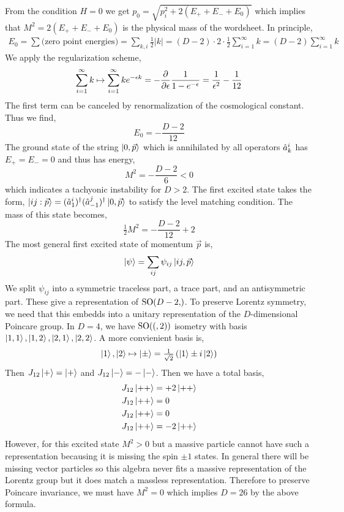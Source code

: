 \documentclass[12pt]{extarticle}
\begin{document}
From the condition $H = 0$ we get $p_0 = \sqrt{p_i^2 + 2 (E_{+} + E_{-} + E_0)}$ which implies that $M^2 = 2 (E_{+} + E_{-} + E_0)$ is the physical mass of the wordsheet. In principle,
\begin{align*}
E_0 = \sum \text{(zero point energies)} = \sum_{k,i} \tfrac{1}{2} |k| = (D - 2) \cdot 2 \cdot \tfrac{1}{2} \sum_{i = 1}^{\infty} k = (D - 2) \sum_{i = 1}^\infty k 
\end{align*}
We apply the regularization scheme,
\[ \sum_{i = 1}^\infty k \mapsto \sum_{i = 1}^\infty k e^{- \epsilon k} = - \frac{\partial{}}{\partial{\epsilon}} \frac{1}{1 - e^{-\epsilon}} = \frac{1}{\epsilon^2} - \frac{1}{12} \]
The first term can be canceled by renormalization of the cosmological constant. Thus we find,
\[ E_0 = - \frac{D - 2}{12} \]
The ground state of the string $\left| 0, \vec{p} \right>$ which is annihilated by all operators $\hat{a}^i_k$ has $E_{+} = E_{-} = 0$ and thus has energy,
\[ M^2 = - \frac{D - 2}{6} < 0 \]
which indicates a tachyonic instability for $D > 2$. The first excited state takes the form, $\left| ij : \vec{p} \right> = (\hat{a}^i_{1})^\dagger (\hat{a}^j_{-1})^\dagger \left| 0, \vec{p} \right>$ to satisfy the level matching condition. The mass of this state becomes, 
\[ \tfrac{1}{2} M^2 = - \frac{D - 2}{12} + 2 \]
The most general first excited state of momentum $\vec{p}$ is,
\[ \left| \psi \right> = \sum_{ij} \psi_{ij} \left| ij, \vec{p} \right> \]
We split $\psi_{ij}$ into a symmetric traceless part, a trace part, and an antisymmetric part. These give a representation of $\SO{D - 2}$. To preserve Lorentz symmetry, we need that this embedds into a unitary representation of the $D$-dimensional Poincare group. In $D = 4$, we have $\mathrm{SO}((, 2))$ isometry with basis $\left| 1,1 \right>, \left| 1,2 \right>, \left| 2,1 \right>, \left| 2,2 \right>$. A more convienient basis is,
\[ \left| 1 \right>, \left| 2 \right> \mapsto \left| \pm \right> = \tfrac{1}{\sqrt{2}} \left( \left| 1 \right> \pm i \left| 2 \right> \right) \] 
Then $J_{12} \left| + \right> = \left| + \right>$ and $J_{12} \left| - \right> = - \left| - \right>$. Then we have a total basis,
\begin{align*}
J_{12} \left| ++ \right> & = + 2 \left| ++ \right> \\
J_{12} \left| ++ \right> & = 0 \\
J_{12} \left| ++ \right> & = 0 \\
J_{12} \left| ++ \right> & = - 2 \left| ++ \right> 
\end{align*} 
However, for this excited state $M^2 > 0$ but a massive particle cannot have such a representation becausing it is missing the spin $\pm 1$ states. In general there will be missing vector particles so this algebra never fits a massive representation of the Lorentz group but it does match a massless representation. Therefore to preserve Poincare invariance, we must have $M^2 = 0$ which implies $D = 26$ by the above formula. 
\end{document}

